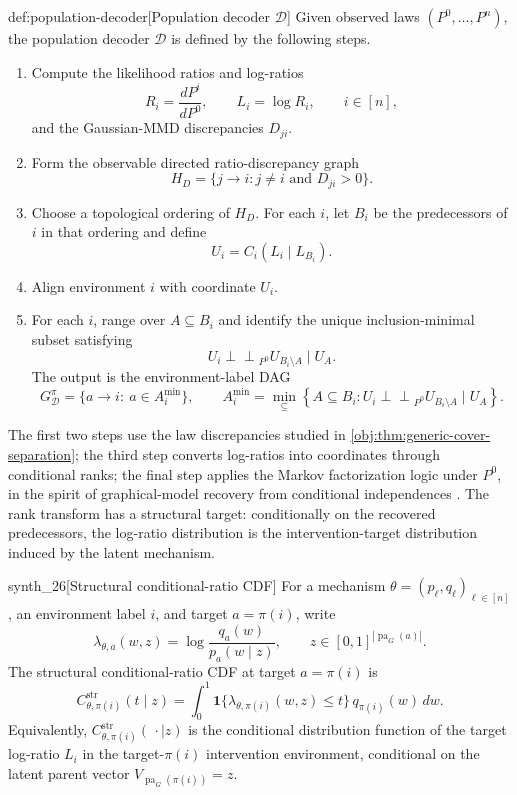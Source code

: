 \begin{algorithmv}{def:population-decoder}[Population decoder $\mathscr D$]
Given observed laws \((P^0,\ldots,P^n)\), the population decoder \(\mathscr D\) is defined by the following steps.
\begin{enumerate}
\item Compute the likelihood ratios and log-ratios
\[
R_i=\frac{dP^i}{dP^0},
\qquad
L_i=\log R_i,
\qquad i\in[n],
\]
and the Gaussian-MMD discrepancies \(D_{ji}\).

\item Form the observable directed ratio-discrepancy graph
\[
H_D=\{j\to i:j\ne i\text{ and }D_{ji}>0\}.
\]

\item Choose a topological ordering of \(H_D\). For each \(i\), let \(B_i\) be the predecessors of \(i\) in that ordering and define
\[
U_i=C_i(L_i\mid L_{B_i}).
\]

\item Align environment \(i\) with coordinate \(U_i\).

\item For each \(i\), range over \(A\subseteq B_i\) and identify the unique inclusion-minimal subset satisfying
\[
U_i\mathbin{\perp\!\!\!\perp}_{P^0}U_{B_i\setminus A}\mid U_A.
\]
The output is the environment-label DAG
\[
G^\pi_{\mathscr D}
=
\{a\to i:\ a\in A_i^{\min}\},
\qquad
A_i^{\min}
=
\min_{\subseteq}
\left\{
A\subseteq B_i:
U_i\mathbin{\perp\!\!\!\perp}_{P^0}U_{B_i\setminus A}\mid U_A
\right\}.
\]
\end{enumerate}
\end{algorithmv}

The first two steps use the law discrepancies studied in \cref{obj:thm:generic-cover-separation}; the third step converts log-ratios into coordinates through conditional ranks; the final step applies the Markov factorization logic under \(P^0\), in the spirit of graphical-model recovery from conditional independences \citep{Pearl2009,SpirtesGlymourScheines2000}. The rank transform has a structural target: conditionally on the recovered predecessors, the log-ratio distribution is the intervention-target distribution induced by the latent mechanism.

\begin{definitionv}{synth_26}[Structural conditional-ratio CDF]
For a mechanism \(\theta=(p_\ell,q_\ell)_{\ell\in[n]}\), an environment label \(i\), and target \(a=\pi(i)\), write
\[
\lambda_{\theta,a}(w,z)
=
\log\frac{q_a(w)}{p_a(w\mid z)},
\qquad z\in[0,1]^{|\operatorname{pa}_G(a)|}.
\]
The structural conditional-ratio CDF at target \(a=\pi(i)\) is
\[
C_{\theta,\pi(i)}^{\mathrm{str}}(t\mid z)
=
\int_0^1
\mathbf 1\{\lambda_{\theta,\pi(i)}(w,z)\le t\}\,
q_{\pi(i)}(w)\,dw .
\]
Equivalently, \(C_{\theta,\pi(i)}^{\mathrm{str}}(\,\cdot\mid z)\) is the conditional distribution function of the target log-ratio \(L_i\) in the target-\(\pi(i)\) intervention environment, conditional on the latent parent vector \(V_{\operatorname{pa}_G(\pi(i))}=z\).
\end{definitionv}

